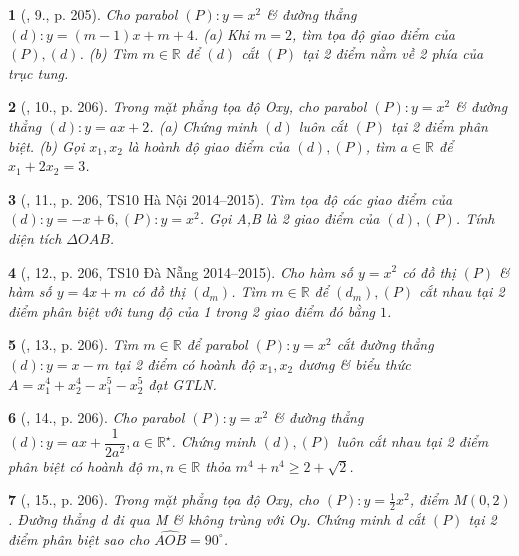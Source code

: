 \documentclass{article}
\newtheorem{baitoan}{}
\begin{document}
\begin{baitoan}[\cite{Thu_Viet_Minh_ptb2}, 9., p. 205]
	Cho parabol $(P):y = x^2$ \& đường thẳng $(d):y = (m - 1)x + m + 4$. (a) Khi $m = 2$, tìm tọa độ giao điểm của $(P),(d)$. (b) Tìm $m\in\mathbb{R}$ để $(d)$ cắt $(P)$ tại 2 điểm nằm về 2 phía của trục tung.
\end{baitoan}

\begin{baitoan}[\cite{Thu_Viet_Minh_ptb2}, 10., p. 206]
	Trong mặt phẳng tọa độ Oxy, cho parabol $(P):y = x^2$ \& đường thẳng $(d):y = ax + 2$. (a) Chứng minh $(d)$ luôn cắt $(P)$ tại 2 điểm phân biệt. (b) Gọi $x_1,x_2$ là hoành độ giao điểm của $(d),(P)$, tìm $a\in\mathbb{R}$ để $x_1 + 2x_2 = 3$.
\end{baitoan}

\begin{baitoan}[\cite{Thu_Viet_Minh_ptb2}, 11., p. 206, TS10 Hà Nội 2014--2015]
	Tìm tọa độ các giao điểm của $(d):y = -x + 6,(P):y = x^2$. Gọi A,B là 2 giao điểm của $(d),(P)$. Tính diện tích $\Delta OAB$.
\end{baitoan}

\begin{baitoan}[\cite{Thu_Viet_Minh_ptb2}, 12., p. 206, TS10 Đà Nẵng 2014--2015]
	Cho hàm số $y = x^2$ có đồ thị $(P)$ \& hàm số $y = 4x + m$ có đồ thị $(d_m)$. Tìm $m\in\mathbb{R}$ để $(d_m),(P)$ cắt nhau tại 2 điểm phân biệt với tung độ của 1 trong 2 giao điểm đó bằng $1$.
\end{baitoan}

\begin{baitoan}[\cite{Thu_Viet_Minh_ptb2}, 13., p. 206]
	Tìm $m\in\mathbb{R}$ để parabol $(P):y = x^2$ cắt đường thẳng $(d):y = x - m$ tại 2 điểm có hoành độ $x_1,x_2$ dương \& biểu thức $A = x_1^4 + x_2^4 - x_1^5 - x_2^5$ đạt {\rm GTLN}.
\end{baitoan}

\begin{baitoan}[\cite{Thu_Viet_Minh_ptb2}, 14., p. 206]
	Cho parabol $(P):y = x^2$ \& đường thẳng $(d):y = ax + \dfrac{1}{2a^2},a\in\mathbb{R}^\star$. Chứng minh $(d),(P)$ luôn cắt nhau tại 2 điểm phân biệt có hoành độ $m,n\in\mathbb{R}$ thỏa $m^4 + n^4\ge2 + \sqrt{2}$.
\end{baitoan}

\begin{baitoan}[\cite{Thu_Viet_Minh_ptb2}, 15., p. 206]
	Trong mặt phẳng tọa độ Oxy, cho $(P):y = \frac{1}{2}x^2$, điểm $M(0,2)$. Đường thẳng d đi qua M \& không trùng với Oy. Chứng minh d cắt $(P)$ tại 2 điểm phân biệt sao cho $\widehat{AOB} = 90^\circ$.
\end{baitoan}
\end{document}
